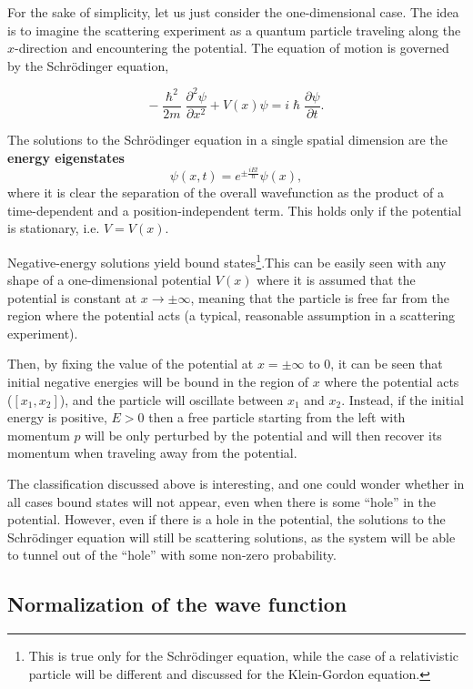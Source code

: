 For the sake of simplicity, let us just consider the one-dimensional case. The idea is to imagine the scattering experiment as a quantum particle traveling along the $x$-direction and encountering the potential. The equation of motion is governed by the Schr\"odinger equation,

\begin{equation}
\label{eq:schrodinger}
 -\frac{\hslash^2}{2m} \frac{\partial^2 \psi}{\partial x^2} + V(x) \psi =  i\hslash \frac{\partial \psi}{\partial t}.
\end{equation}

The solutions to the Schr\"odinger equation in a single spatial dimension are the {\bf energy eigenstates}
\[\psi(x,t) = e^{\pm \frac{iEt}{\hslash}}\psi(x),\]
where it is clear the separation of the overall wavefunction as the product of a time-dependent and a position-independent term. This holds only if the potential is stationary, i.e. $V=V(x)$.

Negative-energy solutions yield bound states\footnote{This is true only for the Schr\"odinger equation, while the case of a relativistic particle will be different and discussed for the Klein-Gordon equation.}.This can be easily seen with any shape of a one-dimensional potential $V(x)$ where it is assumed that the potential is constant at $x \rightarrow \pm \infty$, meaning that the particle is free far from the region where the potential acts (a typical, reasonable assumption in a scattering experiment). 

Then, by fixing the value of the potential at $x=\pm\infty$ to $0$, it can be seen that initial negative energies will be bound in the region of $x$ where the potential acts ($[x_1,x_2]$), and the particle will oscillate between $x_1$ and $x_2$. Instead, if the initial energy is positive, $E>0$ then a free particle starting from the left with momentum $p$ will be only perturbed by the potential and will then recover its momentum when traveling away from the potential. 

The classification discussed above is interesting, and one could wonder whether in all cases bound states will not appear, even when there is some ``hole'' in the potential. However, even if there is a hole in the potential, the solutions to the Schr\"odinger equation will still be scattering solutions, as the system will be able to tunnel out of the ``hole'' with some non-zero probability.

\subsection{Normalization of the wave function}

